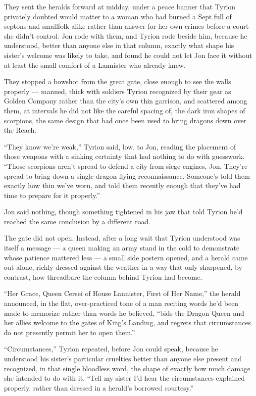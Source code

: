 \sceneBreak

They sent the heralds forward at midday, under a peace banner that Tyrion privately doubted would matter to a woman who had burned a Sept full of septons and smallfolk alike rather than answer for her own crimes before a court she didn’t control. Jon rode with them, and Tyrion rode beside him, because he understood, better than anyone else in that column, exactly what shape his sister’s welcome was likely to take, and found he could not let Jon face it without at least the small comfort of a Lannister who already knew.

They stopped a bowshot from the great gate, close enough to see the walls properly — manned, thick with soldiers Tyrion recognized by their gear as Golden Company rather than the city’s own thin garrison, and scattered among them, at intervals he did not like the careful spacing of, the dark iron shapes of scorpions, the same design that had once been used to bring dragons down over the Reach.

“They know we’re weak,” Tyrion said, low, to Jon, reading the placement of those weapons with a sinking certainty that had nothing to do with guesswork. “Those scorpions aren’t spread to defend a city from siege engines, Jon. They’re spread to bring down a single dragon flying reconnaissance. Someone’s told them exactly how thin we’ve worn, and told them recently enough that they’ve had time to prepare for it properly.”

Jon said nothing, though something tightened in his jaw that told Tyrion he’d reached the same conclusion by a different road.

The gate did not open. Instead, after a long wait that Tyrion understood was itself a message — a queen making an army stand in the cold to demonstrate whose patience mattered less — a small side postern opened, and a herald came out alone, richly dressed against the weather in a way that only sharpened, by contrast, how threadbare the column behind Tyrion had become.

“Her Grace, Queen Cersei of House Lannister, First of Her Name,” the herald announced, in the flat, over-practiced tone of a man reciting words he’d been made to memorize rather than words he believed, “bids the Dragon Queen and her allies welcome to the gates of King’s Landing, and regrets that circumstances do not presently permit her to open them.”

\sceneBreak

“Circumstances,” Tyrion repeated, before Jon could speak, because he understood his sister’s particular cruelties better than anyone else present and recognized, in that single bloodless word, the shape of exactly how much damage she intended to do with it. “Tell my sister I’d hear the circumstances explained properly, rather than dressed in a herald’s borrowed courtesy.”

